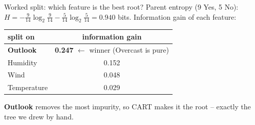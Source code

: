 \documentclass[aspectratio=169]{beamer}
\begin{document}
\begin{frame}{Worked split: which feature is the best root?}
  Parent entropy (9 Yes, 5 No): $H = -\tfrac{9}{14}\log_2\tfrac{9}{14} - \tfrac{5}{14}\log_2\tfrac{5}{14} = 0.940$ bits. Information gain of each feature:
  \vfill
  \begin{center}\small
    \renewcommand{\arraystretch}{1.3}
    \begin{tabular}{l c}
      split on & information gain \\
      \hline
      \textbf{Outlook} & \textbf{0.247} \quad$\leftarrow$ winner (Overcast is pure) \\
      Humidity & 0.152 \\
      Wind & 0.048 \\
      Temperature & 0.029 \\
      \hline
    \end{tabular}
  \end{center}
  \vfill
  \textbf{Outlook} removes the most impurity, so CART makes it the root -- exactly the
  tree we drew by hand.
  \vfill
\end{frame}
\end{document}
